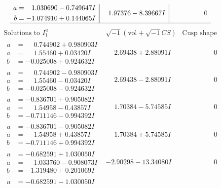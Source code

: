 \documentclass[1p]{elsarticle_modified}
\theoremstyle{definition}
\newcommand{\I}{\sqrt{-1}}
\begin{document}
$$\begin{array}{c|c|c}
\begin{aligned}
a &= \phantom{-}1.030690 - 0.749647 I \\
b &= -1.074910 + 0.144065 I\end{aligned}
 & \phantom{-}1.97376 - 8.39667 I & \phantom{-0.000000 } 0\\
 \hline 
 \end{array}$$\newpage$$\begin{array}{c|c|c}  
\text{Solutions to }I^u_{1}& \I (\text{vol} + \sqrt{-1}CS) & \text{Cusp shape}\\
 \hline 
\begin{aligned}
u &= \phantom{-}0.744902 + 0.980903 I \\
a &= \phantom{-}1.55460 + 0.03420 I \\
b &= -0.025008 + 0.924632 I\end{aligned}
 & \phantom{-}2.69438 + 2.88091 I & \phantom{-0.000000 } 0 \\ \hline\begin{aligned}
u &= \phantom{-}0.744902 - 0.980903 I \\
a &= \phantom{-}1.55460 - 0.03420 I \\
b &= -0.025008 - 0.924632 I\end{aligned}
 & \phantom{-}2.69438 - 2.88091 I & \phantom{-0.000000 } 0 \\ \hline\begin{aligned}
u &= -0.836701 + 0.905082 I \\
a &= \phantom{-}1.54958 - 0.43857 I \\
b &= -0.711146 - 0.994392 I\end{aligned}
 & \phantom{-}1.70384 - 5.74585 I & \phantom{-0.000000 } 0 \\ \hline\begin{aligned}
u &= -0.836701 - 0.905082 I \\
a &= \phantom{-}1.54958 + 0.43857 I \\
b &= -0.711146 + 0.994392 I\end{aligned}
 & \phantom{-}1.70384 + 5.74585 I & \phantom{-0.000000 } 0 \\ \hline\begin{aligned}
u &= -0.682591 + 1.030050 I \\
a &= \phantom{-}1.033760 - 0.908073 I \\
b &= -1.319480 + 0.201069 I\end{aligned}
 & -2.90298 - 13.34080 I & \phantom{-0.000000 } 0 \\ \hline\begin{aligned}
u &= -0.682591 - 1.030050 I \\

\end{aligned}
\end{array}$$
\end{document}
